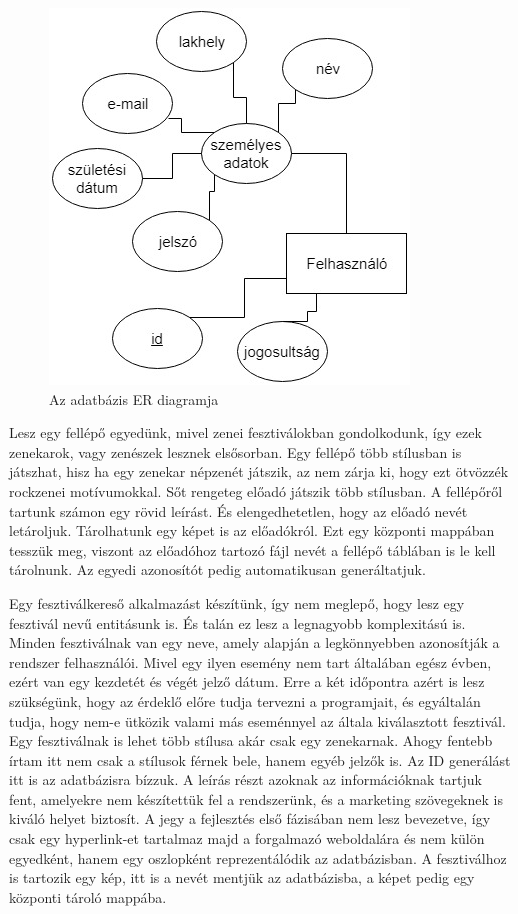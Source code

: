 \begin{figure}
\centering
\includegraphics[scale=0.6]{kepek/userER.jpg}
\caption{Az adatbázis ER diagramja}
\label{fig:usEr}
\end{figure}

Lesz egy fellépő egyedünk, mivel zenei fesztiválokban gondolkodunk, így ezek zenekarok, vagy zenészek lesznek elsősorban. Egy fellépő több stílusban is játszhat, hisz ha egy zenekar népzenét játszik, az nem zárja ki, hogy ezt ötvözzék rockzenei motívumokkal. Sőt rengeteg előadó játszik több stílusban. A fellépőről tartunk számon egy rövid leírást. És elengedhetetlen, hogy az előadó nevét letároljuk. Tárolhatunk egy képet is az előadókról. Ezt egy központi mappában tesszük meg, viszont az előadóhoz tartozó fájl nevét a fellépő táblában is le kell tárolnunk. Az egyedi azonosítót pedig automatikusan generáltatjuk. 

Egy fesztiválkereső alkalmazást készítünk, így nem meglepő, hogy lesz egy fesztivál nevű entitásunk is. És talán ez lesz a legnagyobb komplexitású is. Minden fesztiválnak van egy neve, amely alapján a legkönnyebben azonosítják a rendszer felhasználói. Mivel egy ilyen esemény nem tart általában egész évben, ezért van egy kezdetét és végét jelző dátum. Erre a két időpontra azért is lesz szükségünk, hogy az érdeklő előre tudja  tervezni a programjait, és egyáltalán tudja, hogy nem-e ütközik valami más eseménnyel az általa kiválasztott fesztivál. Egy fesztiválnak is lehet több stílusa akár csak egy zenekarnak. Ahogy fentebb írtam itt nem csak a stílusok férnek bele, hanem egyéb jelzők is. Az ID generálást itt is az adatbázisra bízzuk. A leírás részt azoknak az információknak tartjuk fent, amelyekre nem készítettük fel a rendszerünk, és a marketing szövegeknek is kiváló helyet biztosít. A jegy a fejlesztés első fázisában nem lesz bevezetve, így csak egy hyperlink-et tartalmaz majd a forgalmazó weboldalára és nem külön egyedként, hanem egy oszlopként reprezentálódik az adatbázisban. A fesztiválhoz is tartozik egy kép, itt is a nevét mentjük az adatbázisba, a képet pedig egy központi tároló mappába. 

